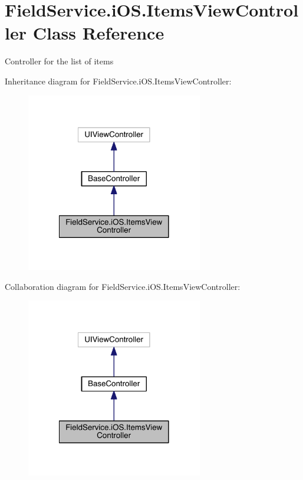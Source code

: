 \hypertarget{class_field_service_1_1i_o_s_1_1_items_view_controller}{\section{Field\+Service.\+i\+O\+S.\+Items\+View\+Controller Class Reference}
\label{class_field_service_1_1i_o_s_1_1_items_view_controller}
}


Controller for the list of items  




Inheritance diagram for Field\+Service.\+i\+O\+S.\+Items\+View\+Controller\+:
\nopagebreak
\begin{figure}[H]
\begin{center}
\leavevmode
\includegraphics[width=218pt]{class_field_service_1_1i_o_s_1_1_items_view_controller__inherit__graph}
\end{center}
\end{figure}


Collaboration diagram for Field\+Service.\+i\+O\+S.\+Items\+View\+Controller\+:
\nopagebreak
\begin{figure}[H]
\begin{center}
\leavevmode
\includegraphics[width=218pt]{class_field_service_1_1i_o_s_1_1_items_view_controller__coll__graph}
\end{center}
\end{figure}
